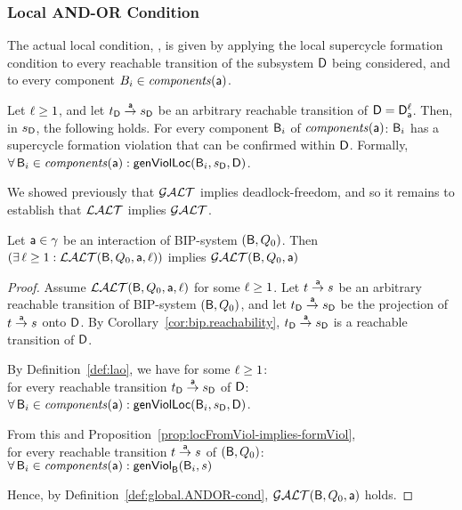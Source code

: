 \subsubsection{Local AND-OR Condition}

The actual local condition, \LAO, is given by applying the local supercycle formation condition to every reachable transition 
of the subsystem $\dsk{\act}{\l}$ being considered, and to every component $B_i \in \cmps{\act}$.

\begin{definition} \label{def:lao}
Let $\l \ge 1$, and let $\tD \goesto[\act] \sD$ be an arbitrary reachable transition of $\DS = \dsks{\act}{\l}$.
Then, in $\sD$, the following holds. 
For every component $\B_i$ of $\cmps{\act}$:  
$\B_i$ has a supercycle formation violation that can be confirmed within $\dsk{\act}{\l}$.
Formally,\\
\ind  $\fa \B_i \in \cmps{\act} : \locFormViol{\B_i}{\sD}{\act}{\l}$.
\end{definition}
%

%
We showed previously that $\GAO$ implies deadlock-freedom, and so it remains to establish that $\LAO$ implies $\GAO$. 


\begin{lemma}
\label{lemma:loc.ANDOR.implies.glob.AND-OR}
\label{LAOGAO}
Let $\act \in \gamma$ be an interaction of BIP-system $(\B, Q_0)$. Then\\
\ind $(\ex \l \ge 1: \LAO(\B, Q_0, \act, \l))$ implies $\GAO(\B, Q_0, \act)$
\end{lemma}
%
\begin{proof}
Assume $\LAO(\B, Q_0, \act, \l)$ for some $\l \ge 1$. 
%
Let $t \goesto[\act] s$ be an arbitrary reachable transition of BIP-system $(\B, Q_0)$, and let 
$\tD \goesto[\act] \sD$ be the projection of $t \goesto[\act] s$ onto $\dsk{\act}{\l}$.
By Corollary~\ref{cor:bip.reachability}, $\tD \goesto[\act] \sD$ is a reachable transition of $\dsk{\act}{\l}$.

\noindent
By Definition~\ref{def:lao}, we have for some $\l \ge 1$:\\
\ind for every reachable transition $\tD \goesto[\act] \sD$ of $\dsk{\act}{\l}$:\\
\ind \ind $\fa \B_i \in \cmps{\act} : \locFormViol{\B_i}{\sD}{\act}{\l}$.

\noindent
From this and Proposition~\ref{prop:locFromViol-implies-formViol},\\
\ind for every reachable transition $t \goesto[\act] s$ of  $(\B, Q_0)$:\\ 
\ind \ind $\fa \B_i \in \cmps{\act} : \formViol{\B_i}{s}$

\noindent
Hence, by Definition~\ref{def:global.ANDOR-cond}, $\GAO(\B, Q_0, \act)$ holds.
\end{proof}



